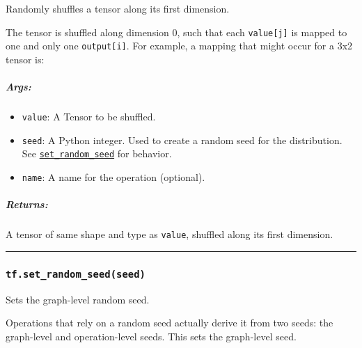 Randomly shuffles a tensor along its first dimension.

The tensor is shuffled along dimension 0, such that each
\texttt{value{[}j{]}} is mapped to one and only one
\texttt{output{[}i{]}}. For example, a mapping that might occur for a
3x2 tensor is:

\begin{Shaded}
\begin{Highlighting}[]
\NormalTok{[[}\NormalTok{, }\NormalTok{],       [[}\NormalTok{, }\NormalTok{],}
 \NormalTok{[}\NormalTok{, }\NormalTok{],  }\OperatorTok{==>}   \NormalTok{[}\NormalTok{, }\NormalTok{],}
 \NormalTok{[}\NormalTok{, }\NormalTok{]]        [}\NormalTok{, }\NormalTok{]]}
\end{Highlighting}
\end{Shaded}

\subparagraph{Args: }\label{args-11}

\begin{itemize}
\tightlist
\item
  \texttt{value}: A Tensor to be shuffled.
\item
  \texttt{seed}: A Python integer. Used to create a random seed for the
  distribution. See
  \href{../../api_docs/python/constant_op.md\#set_random_seed}{\texttt{set\_random\_seed}}
  for behavior.
\item
  \texttt{name}: A name for the operation (optional).
\end{itemize}

\subparagraph{Returns: }\label{returns-11}

A tensor of same shape and type as \texttt{value}, shuffled along its
first dimension.

\begin{center}\rule{0.5\linewidth}{\linethickness}\end{center}

\subsubsection{\texorpdfstring{\texttt{tf.set\_random\_seed(seed)}
}{tf.set\_random\_seed(seed) }}\label{tf.setux5frandomux5fseedseed}

Sets the graph-level random seed.

Operations that rely on a random seed actually derive it from two seeds:
the graph-level and operation-level seeds. This sets the graph-level
seed.

